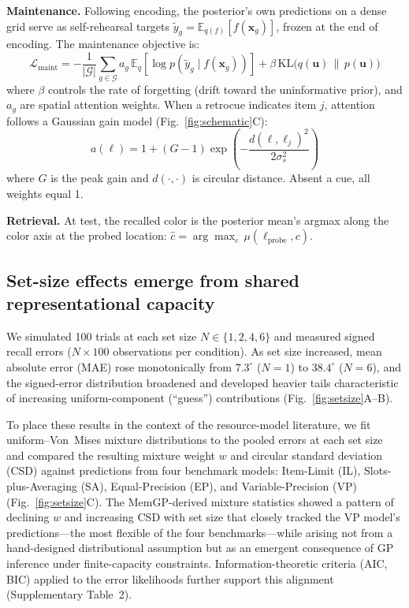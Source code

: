 \documentclass[11pt,letterpaper]{article}
\newcommand{\KL}{\mathrm{KL}}
\newcommand{\E}{\mathbb{E}}
\newcommand{\bx}{\mathbf{x}}
\newcommand{\bu}{\mathbf{u}}
\begin{document}
\textbf{Maintenance.} Following encoding, the posterior's own predictions on a dense grid serve as self-rehearsal targets $\tilde{y}_g = \E_{q(f)}[f(\bx_g)]$, frozen at the end of encoding. The maintenance objective is:
\begin{equation}
    \mathcal{L}_{\mathrm{maint}} = -\frac{1}{|\mathcal{G}|}\sum_{g \in \mathcal{G}} a_g \, \E_q\!\left[\log p(\tilde{y}_g \mid f(\bx_g))\right] + \beta \, \KL\bigl(q(\bu) \,\|\, p(\bu)\bigr)
    \label{eq:elbo_maint}
\end{equation}
where $\beta$ controls the rate of forgetting (drift toward the uninformative prior), and $a_g$ are spatial attention weights. When a retrocue indicates item $j$, attention follows a Gaussian gain model (Fig.~\ref{fig:schematic}C):
\begin{equation}
    a(\ell) = 1 + (G - 1)\exp\!\left(-\frac{d(\ell, \ell_j)^2}{2\sigma_s^2}\right)
    \label{eq:attention}
\end{equation}
where $G$ is the peak gain and $d(\cdot, \cdot)$ is circular distance. Absent a cue, all weights equal 1.

\textbf{Retrieval.} At test, the recalled color is the posterior mean's argmax along the color axis at the probed location: $\hat{c} = \arg\max_c \, \mu(\ell_{\mathrm{probe}}, c)$.


\subsection{Set-size effects emerge from shared representational capacity}

We simulated 100 trials at each set size $N \in \{1, 2, 4, 6\}$ and measured signed recall errors ($N \times 100$ observations per condition). As set size increased, mean absolute error (MAE) rose monotonically from $7.3^\circ$ ($N\!=\!1$) to $38.4^\circ$ ($N\!=\!6$), and the signed-error distribution broadened and developed heavier tails characteristic of increasing uniform-component (``guess'') contributions (Fig.~\ref{fig:setsize}A--B).

To place these results in the context of the resource-model literature, we fit uniform--Von~Mises mixture distributions \cite{zhangDiscreteFixedresolutionRepresentations2008b} to the pooled errors at each set size and compared the resulting mixture weight $w$ and circular standard deviation (CSD) against predictions from four benchmark models: Item-Limit (IL), Slots-plus-Averaging (SA), Equal-Precision (EP), and Variable-Precision (VP) \cite{vandenbergVariabilityEncodingPrecision2012} (Fig.~\ref{fig:setsize}C). The MemGP-derived mixture statistics showed a pattern of declining $w$ and increasing CSD with set size that closely tracked the VP model's predictions---the most flexible of the four benchmarks---while arising not from a hand-designed distributional assumption but as an emergent consequence of GP inference under finite-capacity constraints. Information-theoretic criteria (AIC, BIC) applied to the error likelihoods further support this alignment (Supplementary Table~2).
\end{document}
